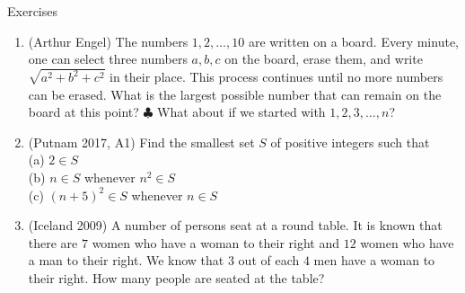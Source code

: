 \begin{xcb}{Exercises}
\begin{enumerate}
\begin{hint}
\end{hint}
\item (Arthur Engel)  The numbers $1, 2, \ldots, 10$ are written on a board. Every minute, one can select three numbers $a, b, c$ on the board, erase them, and write $\sqrt{a^2+b^2+c^2}$ in their place. This process continues until no more numbers can be erased. What is the largest possible number that can remain on the board at this point? $\clubsuit$ What about if we started with $1, 2, 3, \ldots, n$?
\begin{hint}
\end{hint}
\item (Putnam 2017, A1) Find the smallest set $S$ of positive integers such that \\
(a) $2 \in S$ \\
(b) $n \in S$ whenever $n^2 \in S$ \\
(c) $(n + 5)^2 \in S$ whenever $n \in S$ \\
\begin{hint}
\end{hint}
\item  (Iceland 2009)  A number of persons seat at a round table. It is known that there are $7$ women who have a woman to their right and $12$ women who have a man to their right. We know that $3$ out of each $4$ men have a woman to their right. How many people are seated at the table?
\begin{hint}
\end{hint}
\end{enumerate}
\end{xcb}